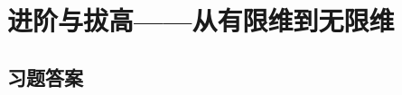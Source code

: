 \documentclass[12pt,a4paper,openany]{ctexbook}
\begin{document}
\part{进阶与拔高——从有限维到无限维}






\printGoodProblems

\appendix
\chapter{习题答案}
\end{document}
